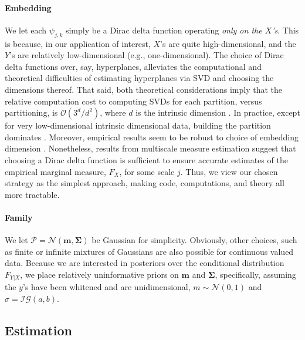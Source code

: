 \documentclass{article} %
\providecommand{\mb}[1]{\boldsymbol{#1}}
\providecommand{\mc}[1]{\mathcal{#1}}
\begin{document}
\paragraph{Embedding} We let each $\psi_{j,k}$ simply be a Dirac delta function operating \emph{only on the $X$'s}.  This is because, in our application of interest, $X$'s are quite high-dimensional, and the $Y$'s are relatively low-dimensional (e.g., one-dimensional).  The choice of Dirac delta functions over, say, hyperplanes, alleviates the computational and theoretical difficulties of estimating hyperplanes via SVD and choosing the dimensions thereof. That said, both theoretical considerations imply that the relative computation cost to computing SVDs for each partition, versus partitioning, is  
$\mc{O}(3^d/d^2)$, where $d$ is the intrinsic dimension \cite{Allard2012}. In practice, except for very low-dimensional intrinsic dimensional data, building the partition dominates \cite{Allard2012}.  Moreover, empirical results seem to be robust to choice of embedding dimension \cite{Lawlor2012}. Nonetheless, results from multiscale measure estimation \cite{ChenMaggioni12} suggest that choosing a Dirac delta function is sufficient to ensure accurate estimates of the empirical marginal measure, $F_X$, for some scale $j$.  Thus, we view our chosen strategy as the simplest approach, making code, computations, and theory all more tractable.  


\paragraph{Family} We let $\mc{P}=\mc{N}(\mb{m},\mb{\Sigma})$ be Gaussian for simplicity. Obviously, other choices, such as finite or infinite mixtures of Gaussians are also possible for continuous valued data.  Because we are interested in posteriors over the conditional distribution $F_{Y|X}$, we place relatively uninformative priors on $\mb{m}$ and $\mb{\Sigma}$, specifically, assuming the $y$'s have been whitened and are unidimensional,  
$m \sim \mc{N}(0,1)$ and $\sigma=\mc{IG}(a,b)$.




\subsection{Estimation}
\end{document}
